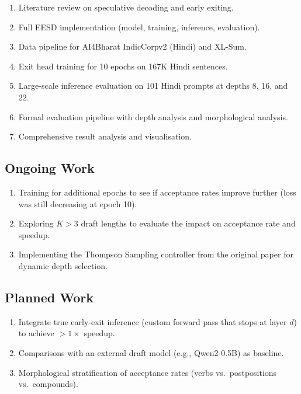 \documentclass[11pt]{article}
\begin{document}
\begin{enumerate}
    \item[\checkmark] Literature review on speculative decoding and early exiting.
    \item[\checkmark] Full EESD implementation (model, training, inference, evaluation).
    \item[\checkmark] Data pipeline for AI4Bharat IndicCorpv2 (Hindi) and XL-Sum.
    \item[\checkmark] Exit head training for 10 epochs on 167K Hindi sentences.
    \item[\checkmark] Large-scale inference evaluation on 101 Hindi prompts at depths 8, 16, and 22.
    \item[\checkmark] Formal evaluation pipeline with depth analysis and morphological analysis.
    \item[\checkmark] Comprehensive result analysis and visualisation.
\end{enumerate}

\subsection{Ongoing Work}

\begin{enumerate}
    \item Training for additional epochs to see if acceptance rates improve further (loss was still decreasing at epoch 10).
    \item Exploring $K > 3$ draft lengths to evaluate the impact on acceptance rate and speedup.
    \item Implementing the Thompson Sampling controller from the original paper for dynamic depth selection.
\end{enumerate}

\subsection{Planned Work}

\begin{enumerate}
    \item Integrate true early-exit inference (custom forward pass that stops at layer $d$) to achieve $> 1\times$ speedup.
    \item Comparisons with an external draft model (e.g., Qwen2-0.5B) as baseline.
    \item Morphological stratification of acceptance rates (verbs vs.\ postpositions vs.\ compounds).
    
\end{enumerate}
\end{document}
